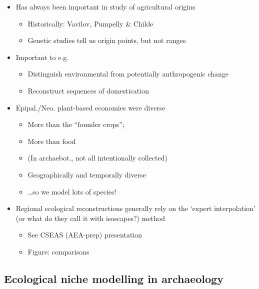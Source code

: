 \documentclass[
  authoryear,
  review]{elsarticle}
\providecommand{\tightlist}{%
  \setlength{\itemsep}{0pt}\setlength{\parskip}{0pt}}\usepackage{longtable,booktabs,array}
\begin{document}
\begin{itemize}
\tightlist
\item
  Has always been important in study of agricultural origins

  \begin{itemize}
  \tightlist
  \item
    Historically: Vavilov, Pumpelly \& Childe
  \item
    Genetic studies tell us origin points, but not ranges
  \end{itemize}
\item
  Important to e.g.

  \begin{itemize}
  \tightlist
  \item
    Distinguish environmental from potentially anthropogenic change
    \citep{MartinEtAl2017, MartinEtAl2025}
  \item
    Reconstruct sequences of domestication \citep{YeomansEtAl2017}
  \end{itemize}
\item
  Epipal./Neo. plant-based economies were diverse

  \begin{itemize}
  \tightlist
  \item
    More than the ``founder crops'';
  \item
    More than food
  \item
    (In archaebot., not all intentionally collected)
  \item
    Geographically and temporally diverse
  \item
    \ldots so we model lots of species!
  \end{itemize}
\item
  Regional ecological reconstructions generally rely on the `expert
  interpolation' (or what do they call it with isoscapes?) method

  \begin{itemize}
  \tightlist
  \item
    See CSEAS (AEA-prep) presentation
  \item
    Figure: comparisons
  \end{itemize}
\end{itemize}

\subsection{Ecological niche modelling in
archaeology}\label{ecological-niche-modelling-in-archaeology}
\end{document}
